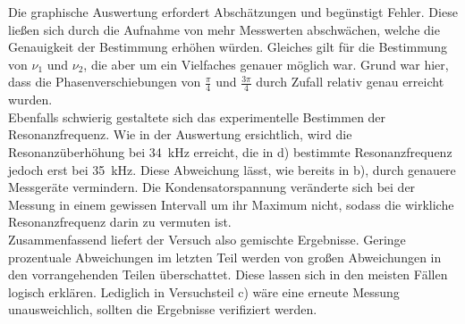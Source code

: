 Die graphische Auswertung erfordert Abschätzungen und begünstigt Fehler. Diese ließen sich
durch die Aufnahme von mehr Messwerten abschwächen, welche die Genauigkeit der Bestimmung erhöhen würden.
Gleiches gilt für die Bestimmung von $\nu_1$ und $\nu_2$, die aber um ein Vielfaches
genauer möglich war. Grund war hier, dass die Phasenverschiebungen von $\frac{\pi}{4}$ und
$\frac{3 \pi}{4}$ durch Zufall relativ genau erreicht wurden.\\
Ebenfalls schwierig gestaltete sich das experimentelle Bestimmen der Resonanzfrequenz. Wie in
der Auswertung ersichtlich, wird die Resonanzüberhöhung bei \SI{34}{\kilo\hertz} erreicht,
die in d) bestimmte Resonanzfrequenz jedoch erst bei \SI{35}{\kilo\hertz}. Diese Abweichung
lässt, wie bereits in b), durch genauere Messgeräte vermindern. Die Kondensatorspannung veränderte sich
bei der Messung in einem gewissen Intervall um ihr Maximum nicht, sodass die wirkliche Resonanzfrequenz
darin zu vermuten ist.\\
Zusammenfassend liefert der Versuch also gemischte Ergebnisse. Geringe prozentuale Abweichungen
im letzten Teil werden von großen Abweichungen in den vorrangehenden Teilen überschattet.
Diese lassen sich in den meisten Fällen logisch erklären. Lediglich in Versuchsteil c)
wäre eine erneute Messung unausweichlich, sollten die Ergebnisse verifiziert werden.
\newpage
\nocite{*}
\printbibliography
